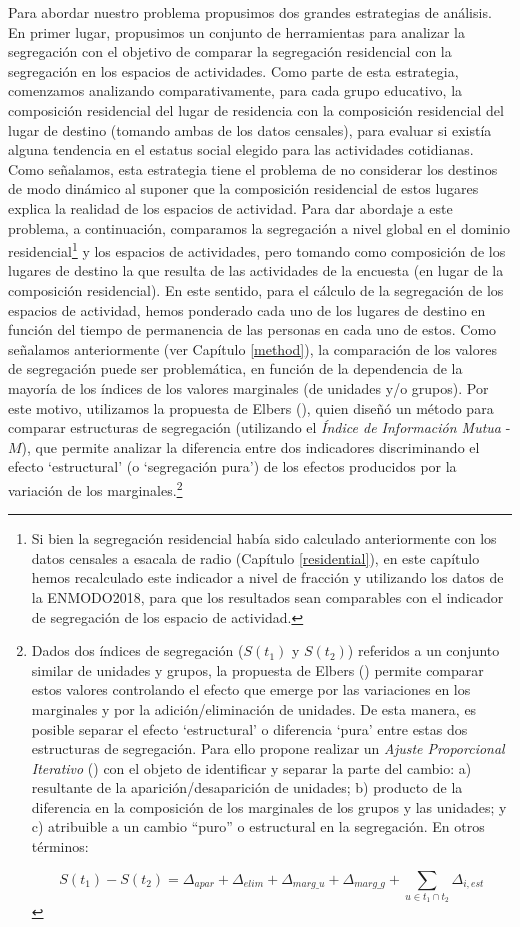 \documentclass[
  spanish,
  a4paper,%
  chapterprefix=true,%
  DIV=calc,%
  twoside]{scrbook}%
\begin{document}
Para abordar nuestro problema propusimos dos grandes estrategias de
análisis. En primer lugar, propusimos un conjunto de herramientas para
analizar la segregación con el objetivo de comparar la segregación
residencial con la segregación en los espacios de actividades. Como
parte de esta estrategia,
comenzamos analizando
comparativamente, para cada grupo educativo, la composición residencial
del lugar de residencia con la composición residencial del lugar de
destino (tomando ambas de los datos censales), para evaluar si existía
alguna tendencia en el estatus social elegido para las actividades
cotidianas. Como señalamos, esta estrategia tiene el problema de no
considerar los destinos de modo dinámico al suponer que la composición
residencial de estos lugares explica la realidad de los espacios de
actividad. Para dar abordaje
a este problema, a continuación, comparamos la segregación a nivel
global en el dominio residencial\footnote{Si bien la segregación residencial
  había sido calculado anteriormente con los datos censales a esacala
  de radio (Capítulo \ref{residential}), en este capítulo hemos
  recalculado este indicador a nivel de fracción y utilizando los
  datos de la ENMODO2018, para que los resultados sean comparables con
  el indicador de segregación de los espacio de actividad.} y los
espacios de actividades, pero tomando como composición de los lugares de
destino la que resulta de las actividades de la encuesta (en lugar de la
composición residencial). En este sentido, para el cálculo de la
segregación de los espacios de actividad, hemos ponderado cada uno de
los lugares de destino en función del tiempo de permanencia de las
personas en cada uno de estos. Como señalamos anteriormente (ver
Capítulo \ref{method}), la comparación de los valores de segregación
puede ser problemática, en función de la dependencia de la mayoría de
los índices de los valores marginales (de unidades y/o grupos). Por este
motivo, utilizamos la propuesta de Elbers (), quien diseñó un método
para comparar estructuras de segregación (utilizando el \emph{Índice de
Información Mutua} - \(M\)), que permite analizar la diferencia entre dos
indicadores discriminando el efecto `estructural' (o `segregación pura')
de los efectos producidos por la variación de los
marginales.\footnote{Dados dos índices de segregación
  (\(S(t_1)\) y \(S(t_2)\)) referidos a un conjunto similar de unidades y
  grupos, la propuesta de Elbers () permite comparar estos valores
  controlando el efecto que emerge por las variaciones en los
  marginales y por la adición/eliminación de unidades. De esta manera,
  es posible separar el efecto `estructural' o diferencia `pura' entre
  estas dos estructuras de segregación. Para ello propone realizar un
  \emph{Ajuste Proporcional Iterativo} () con el objeto de
  identificar y separar la parte del cambio: a) resultante de la
  aparición/desaparición de unidades; b) producto de la diferencia en
  la composición de los marginales de los grupos y las unidades; y c)
  atribuible a un cambio ``puro'' o estructural en la segregación. En
  otros términos:

  \[ S(t_1)-S(t_2) = \Delta_{apar} + \Delta_{elim} + \Delta_{marg\_u} + \Delta_{marg\_g} + \sum_{u \in t_1 \cap t_2} \Delta_{i, est} \]}
\end{document}
